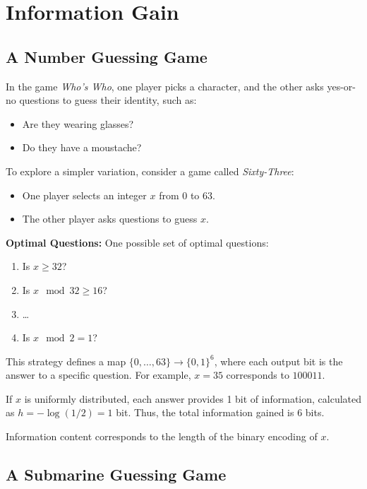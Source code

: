 \section{Information Gain}

\subsection{A Number Guessing Game}

In the game \textit{Who's Who}, one player picks a character, and the other asks yes-or-no questions to guess their identity, such as:
\begin{itemize}
    \item Are they wearing glasses?
    \item Do they have a moustache?
\end{itemize}

To explore a simpler variation, consider a game called \textit{Sixty-Three}:
\begin{itemize}
    \item One player selects an integer \( x \) from 0 to 63.
    \item The other player asks questions to guess \( x \).
\end{itemize}

\textbf{Optimal Questions:} One possible set of optimal questions:
\begin{enumerate}
    \item Is \( x \geq 32 \)?
    \item Is \( x \mod 32 \geq 16 \)?
    \item \dots
    \item Is \( x \mod 2 = 1 \)?
\end{enumerate}

This strategy defines a map \( \{0, \dots, 63\} \to \{0,1\}^6 \), where each output bit is the answer to a specific question. For example, \( x = 35 \) corresponds to \( 100011 \).

If \( x \) is uniformly distributed, each answer provides 1 bit of information, calculated as \( h = -\log(1/2) = 1 \) bit. Thus, the total information gained is 6 bits.

Information content corresponds to the length of the binary encoding of \( x \).

\subsection{A Submarine Guessing Game}


